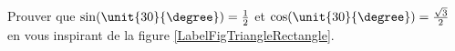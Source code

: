 
\begin{exercice}\label{exoOutilsMath-0003}

	Prouver que $\sin(\unit{30}{\degree})=\frac{ 1 }{2}$ et $\cos(\unit{30}{\degree})=\frac{ \sqrt{3} }{2}$ en vous inspirant de la figure \ref{LabelFigTriangleRectangle}.
	\newcommand{\CaptionFigTriangleRectangle}{Un triangle équilatéral de côté $1$.}
	

\end{exercice}
